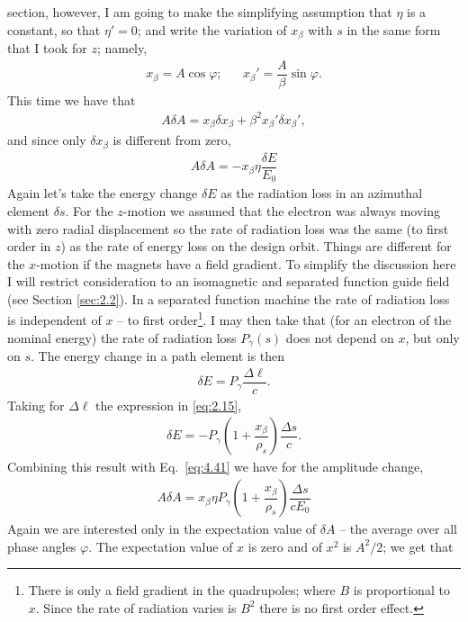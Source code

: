 section, however, I am going to make the simplifying assumption that $\eta$ is a constant, so that $\eta' = 0$; and write the variation of $x_\beta$ with $s$ in the same form that I took for $z$; namely,
\begin{align}
	x_\beta = A \cos \varphi; && x_\beta' = \dfrac{A}{\beta} \sin \varphi.
\end{align}
This time we have that
\begin{align}
	A \delta A = x_\beta \delta x_\beta + \beta^2 x_\beta' \delta x_\beta',
\end{align}
and since only $\delta x_\beta$ is different from zero,
\begin{align} \label{eq:4.41}
	A \delta A = - x_\beta \eta \dfrac{\delta E}{E_0}
\end{align}
Again let's take the energy change $\delta E$ as the radiation loss in an azimuthal element $\delta s$. For the $z$-motion we assumed that the electron was always moving with zero radial displacement so the rate of radiation loss was the same (to first order in $z$) as the rate of energy loss on the design orbit. Things are different for the $x$-motion if the magnets have a field gradient. To simplify the discussion here I will restrict consideration to an isomagnetic
 and separated function guide field (see Section \ref{sec:2.2}). In a separated function machine the rate of radiation loss is independent of $x$ -- to first order\footnote{There is only a field gradient in the quadrupoles; where $B$ is proportional to $x$. Since the rate of radiation varies is $B^2$ there is no first order effect.}. I may then take that (for an electron of the nominal energy) the rate of radiation loss $P_\gamma(s)$ does not depend on $x$, but only on $s$.
The energy change in a path element is then
\begin{align}
	\delta E = P_\gamma \dfrac{\Delta \ell}{c}.
\end{align}
Taking for $\Delta \ell$ the expression in \eqref{eq:2.15},
\begin{align}
	\delta E = - P_\gamma \left( 1 + \dfrac{x_\beta}{\rho_s} \right) \dfrac{\Delta s}{c} .
\end{align}
Combining this result with Eq.~\eqref{eq:4.41} we have for the amplitude change,
\begin{align}
	A \delta A = x_\beta \eta P_\gamma \left( 1 + \dfrac{x_\beta}{\rho_s} \right) \dfrac{\Delta s}{cE_0}
\end{align}
Again we are interested only in the expectation value of $\delta A$ -- the average over all
phase angles $\varphi$. The expectation value of $x$ is zero and of $x^2$ is $A^2/2$; we get that
